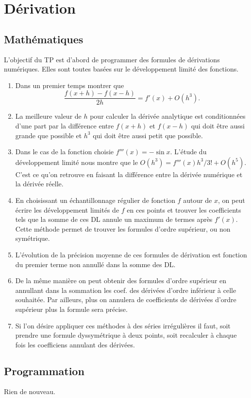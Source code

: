 \section{Dérivation}


\subsection{Mathématiques}
L'objectif du TP est d'abord de programmer des formules de dérivations numériques. 
Elles sont toutes basées sur le développement limité des fonctions. 

\begin{enumerate}
\item Dans un premier temps montrer que 
$$\frac{f(x+h)-f(x-h)}{2h} = f'(x) + O(h^3).$$

\item La meilleure valeur de $h$ pour calculer la dérivée analytique est conditionnées d'une part par la différence entre  $f(x+h)$ et $f(x-h)$ qui doit être aussi grande que possible et $h^3$ qui doit être aussi petit que possible. 

\item Dans le cas de la fonction choisie $f'''(x) = -\sin x$. L'étude du développement limité nous montre que le $O(h^3) = f'''(x) h^3/3! + O(h^5)$. C'est ce qu'on retrouve en faisant la différence entre la dérivée numérique et la dérivée réelle. 

\item En choisissant un échantillonnage régulier de fonction $f$ autour de $x$, on peut écrire les développement limités de $f$ en ces points et trouver les coefficients tels que la somme de ces DL annule un maximum de termes après $f'(x)$. Cette méthode permet de trouver les formules d'ordre supérieur, ou non symétrique.

\item L'évolution de la précision moyenne de ces formules de dérivation est fonction du premier terme non annullé dans la somme des DL. 


\item De la même manière on peut obtenir des formules d'ordre supérieur en annullant dans la sommation les coef. des dérivées d'ordre inférieur à celle souhaitée. Par ailleurs, plus on annulera de coefficients de dérivées d'ordre supérieur plus la formule sera précise.

\item Si l'on désire appliquer ces méthodes à des séries irrégulières il faut, soit prendre une formule dyssymétrique à deux points, soit recalculer à chaque fois les coefficiens annulant des dérivées.  
\end{enumerate}
\subsection{Programmation}
Rien de nouveau. 

